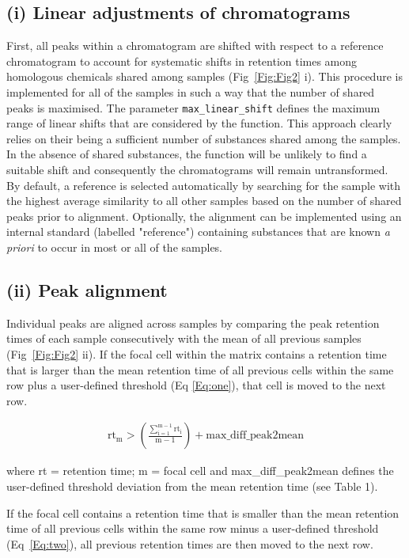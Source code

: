 \documentclass[10pt,letterpaper]{article}
\begin{document}
\subsection*{(i) Linear adjustments of chromatograms}
First, all peaks within a chromatogram are shifted with respect to a reference chromatogram to account for systematic shifts in retention times among homologous chemicals shared among samples (Fig~\ref{Fig:Fig2} i). This procedure is implemented for all of the samples in such a way that the number of shared peaks is maximised. The parameter \texttt{max\_linear\_shift} defines the maximum range of linear shifts that are considered by the function. This approach clearly relies on their being a sufficient number of substances shared among the samples. In the absence of shared substances, the function will be unlikely to find a suitable shift and consequently the chromatograms will remain untransformed. By default, a reference is selected automatically by searching for the sample with the highest average similarity to all other samples based on the number of shared peaks prior to alignment. Optionally, the alignment can be implemented using an internal standard (labelled "reference") containing substances that are known \textit{a priori} to occur in most or all of the samples.

\subsection*{(ii) Peak alignment}
Individual peaks are aligned across samples by comparing the peak retention times of each sample consecutively with the mean of all previous samples (Fig~\ref{Fig:Fig2} ii). If the focal cell within the matrix contains a retention time that is larger than the mean retention time of all previous cells within the same row plus a user-defined threshold (Eq \eqref{Eq:one}), that cell is moved to the next row.

\begin{eqnarray}
\label{Eq:one}
\mathrm{rt_m} > \left(\frac{\mathrm{\sum_{i=1}^{m-1}rt_{i}}}{\mathrm{m}-1}\right) + \mathrm{max\_diff\_peak2mean}
\end{eqnarray}

where rt = retention time; m = focal cell and max\_diff\_peak2mean defines the user-defined threshold deviation from the mean retention time (see Table 1).

If the focal cell contains a retention time that is smaller than the mean retention time of all previous cells within the same row minus a user-defined threshold (Eq~\eqref{Eq:two}), all previous retention times are then moved to the next row.
\end{document}
